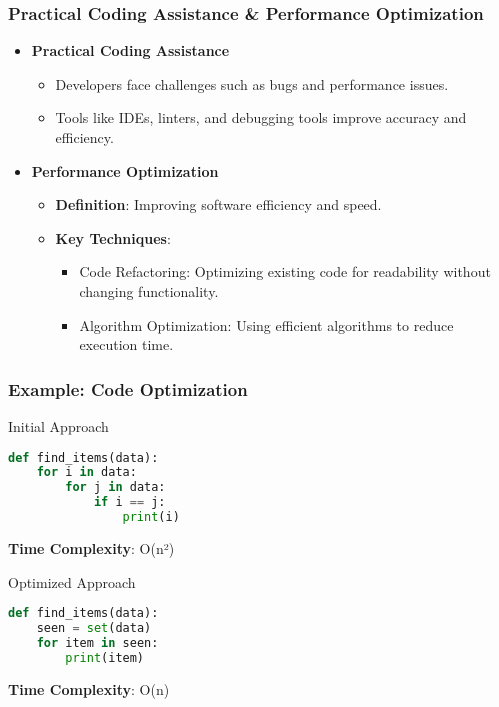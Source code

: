 \documentclass[aspectratio=169]{beamer}
\begin{document}
\begin{frame}[fragile]
    \frametitle{Practical Coding Assistance \& Performance Optimization}
    \begin{itemize}
        \item \textbf{Practical Coding Assistance}
            \begin{itemize}
                \item Developers face challenges such as bugs and performance issues.
                \item Tools like IDEs, linters, and debugging tools improve accuracy and efficiency.
            \end{itemize}
        \item \textbf{Performance Optimization}
            \begin{itemize}
                \item \textbf{Definition}: Improving software efficiency and speed.
                \item \textbf{Key Techniques}:
                    \begin{itemize}
                        \item Code Refactoring: Optimizing existing code for readability without changing functionality.
                        \item Algorithm Optimization: Using efficient algorithms to reduce execution time.
                    \end{itemize}
            \end{itemize}
    \end{itemize}
\end{frame}

\begin{frame}[fragile]
    \frametitle{Example: Code Optimization}
    \begin{block}{Initial Approach}
        \begin{lstlisting}[language=Python]
def find_items(data):
    for i in data:
        for j in data:
            if i == j:
                print(i)
        \end{lstlisting}
        \textbf{Time Complexity}: O(n²)
    \end{block}
    
    \begin{block}{Optimized Approach}
        \begin{lstlisting}[language=Python]
def find_items(data):
    seen = set(data)
    for item in seen:
        print(item)
        \end{lstlisting}
        \textbf{Time Complexity}: O(n)
    \end{block}
\end{frame}
\end{document}
